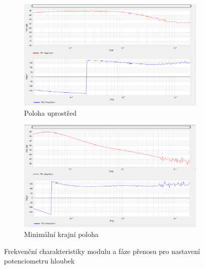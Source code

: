 \documentclass[a4paper, czech]{article}
\begin{document}
\begin{figure}[H]
    \centering
    \begin{subfigure}{0.49\textwidth}
        \includegraphics[width=\textwidth]{nkzt9_2_mid_min_min.png}
        \caption{Poloha uprostřed}
    \end{subfigure}
    \hfill
    \begin{subfigure}{0.49\textwidth}
        \includegraphics[width=\textwidth]{nkzt9_2_max_min_min.png}
        \caption{Minimální krajní poloha}
    \end{subfigure}
    \caption{Frekvenční charakteristiky modulu a fáze přenosu pro nastavení potenciometru hloubek} 
\end{figure}
\end{document}
